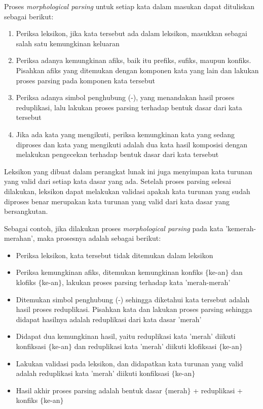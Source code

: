 Proses \textit{morphological parsing} untuk setiap kata dalam masukan dapat dituliskan sebagai berikut:
\begin{enumerate}
	\item Periksa leksikon, jika kata tersebut ada dalam leksikon, masukkan sebagai salah satu kemungkinan keluaran
	\item Periksa adanya kemungkinan afiks, baik itu prefiks, sufiks, maupun konfiks. Pisahkan afiks yang ditemukan dengan komponen kata yang lain dan lakukan proses parsing pada komponen kata tersebut
	\item Periksa adanya simbol penghubung (-), yang menandakan hasil proses reduplikasi, lalu lakukan proses parsing terhadap bentuk dasar dari kata tersebut
	\item Jika ada kata yang mengikuti, periksa kemungkinan kata yang sedang diproses dan kata yang mengikuti adalah dua kata hasil komposisi dengan melakukan pengecekan terhadap bentuk dasar dari kata tersebut
\end{enumerate}

Leksikon yang dibuat dalam perangkat lunak ini juga menyimpan kata turunan yang valid dari setiap kata dasar yang ada. Setelah proses parsing selesai dilakukan, leksikon dapat melakukan validasi apakah kata turunan yang sudah diproses benar merupakan kata turunan yang valid dari kata dasar yang bersangkutan. 

Sebagai contoh, jika dilakukan proses \textit{morphological parsing} pada kata 'kemerah-merahan', maka prosesnya adalah sebagai berikut:
\begin{itemize}
	\item Periksa leksikon, kata tersebut tidak ditemukan dalam leksikon
	\item Periksa kemungkinan afiks, ditemukan kemungkinan konfiks $\lbrace$ke-an$\rbrace$ dan klofiks $\lbrace$ke-an$\rbrace$, lakukan proses parsing terhadap kata 'merah-merah'
	\item Ditemukan simbol penghubung (-) sehingga diketahui kata tersebut adalah hasil proses reduplikasi. Pisahkan kata dan lakukan proses parsing sehingga didapat hasilnya adalah reduplikasi dari kata dasar 'merah'
	\item Didapat dua kemungkinan hasil, yaitu reduplikasi kata 'merah' diikuti konfiksasi $\lbrace$ke-an$\rbrace$ dan reduplikasi kata 'merah' diikuti klofiksasi $\lbrace$ke-an$\rbrace$
	\item Lakukan validasi pada leksikon, dan didapatkan kata turunan yang valid adalah reduplikasi kata 'merah' diikuti konfiksasi $\lbrace$ke-an$\rbrace$
	\item Hasil akhir proses parsing adalah bentuk dasar $\lbrace$merah$\rbrace$ + reduplikasi + konfiks $\lbrace$ke-an$\rbrace$
\end{itemize}

